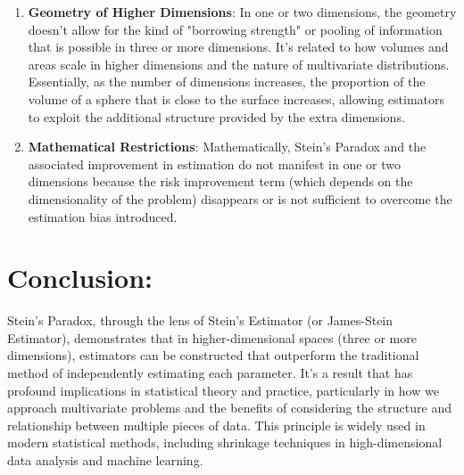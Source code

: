 \documentclass{article}
\begin{document}
\begin{enumerate}
    \item \textbf{Geometry of Higher Dimensions}: In one or two dimensions, the geometry doesn't allow for the kind of "borrowing strength" or pooling of information that is possible in three or more dimensions. It's related to how volumes and areas scale in higher dimensions and the nature of multivariate distributions. Essentially, as the number of dimensions increases, the proportion of the volume of a sphere that is close to the surface increases, allowing estimators to exploit the additional structure provided by the extra dimensions.
    \item \textbf{Mathematical Restrictions}: Mathematically, Stein's Paradox and the associated improvement in estimation do not manifest in one or two dimensions because the risk improvement term (which depends on the dimensionality of the problem) disappears or is not sufficient to overcome the estimation bias introduced.
\end{enumerate}

\section*{Conclusion:}

Stein's Paradox, through the lens of Stein's Estimator (or James-Stein Estimator), demonstrates that in higher-dimensional spaces (three or more dimensions), estimators can be constructed that outperform the traditional method of independently estimating each parameter. It's a result that has profound implications in statistical theory and practice, particularly in how we approach multivariate problems and the benefits of considering the structure and relationship between multiple pieces of data. This principle is widely used in modern statistical methods, including shrinkage techniques in high-dimensional data analysis and machine learning.
\end{document}
